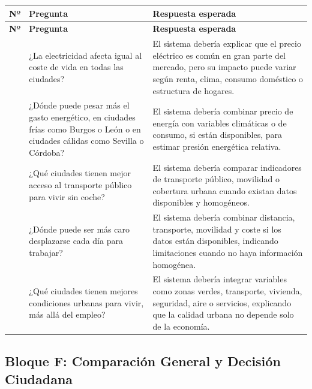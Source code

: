 \begin{longtable}{>{\raggedright\arraybackslash}p{} >{\raggedright\arraybackslash}p{} >{\raggedright\arraybackslash}p{}}
\toprule
\textbf{Nº} & \textbf{Pregunta} & \textbf{Respuesta esperada} \\
\midrule
\endfirsthead
\toprule
\textbf{Nº} & \textbf{Pregunta} & \textbf{Respuesta esperada} \\
\midrule
\endhead
21 & ¿La electricidad afecta igual al coste de vida en todas las ciudades? & El sistema debería explicar que el precio eléctrico es común en gran parte del mercado, pero su impacto puede variar según renta, clima, consumo doméstico o estructura de hogares. \\
22 & ¿Dónde puede pesar más el gasto energético, en ciudades frías como Burgos o León o en ciudades cálidas como Sevilla o Córdoba? & El sistema debería combinar precio de energía con variables climáticas o de consumo, si están disponibles, para estimar presión energética relativa. \\
23 & ¿Qué ciudades tienen mejor acceso al transporte público para vivir sin coche? & El sistema debería comparar indicadores de transporte público, movilidad o cobertura urbana cuando existan datos disponibles y homogéneos. \\
24 & ¿Dónde puede ser más caro desplazarse cada día para trabajar? & El sistema debería combinar distancia, transporte, movilidad y coste si los datos están disponibles, indicando limitaciones cuando no haya información homogénea. \\
25 & ¿Qué ciudades tienen mejores condiciones urbanas para vivir, más allá del empleo? & El sistema debería integrar variables como zonas verdes, transporte, vivienda, seguridad, aire o servicios, explicando que la calidad urbana no depende solo de la economía. \\
\bottomrule
\end{longtable}

\subsection{Bloque F: Comparación General y Decisión Ciudadana}

